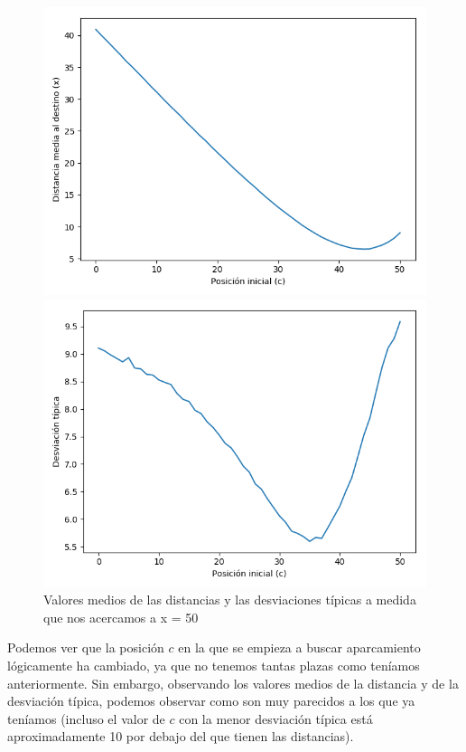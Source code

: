 \documentclass[11pt,a4paper]{report}
\begin{document}
\begin{figure}[H]
\centering
\begin{minipage}{0.5\textwidth}
  \centering
  \includegraphics[scale=0.4]{img/x-50-2-90.png}
\end{minipage}%
\begin{minipage}{0.5\textwidth}
  \centering
  \includegraphics[scale=0.4]{img/dt-50-2-90.png}
\end{minipage}
\caption{Valores medios de las distancias y las desviaciones típicas a medida que nos acercamos a x = 50}
\end{figure}

Podemos ver que la posición $c$ en la que se empieza a buscar aparcamiento lógicamente ha cambiado, ya que no tenemos tantas
plazas como teníamos anteriormente. Sin embargo, observando los valores medios de la distancia y de la desviación típica,
podemos observar como son muy parecidos a los que ya teníamos (incluso el valor de $c$ con la menor desviación típica está
aproximadamente 10 por debajo del que tienen las distancias).
\end{document}
